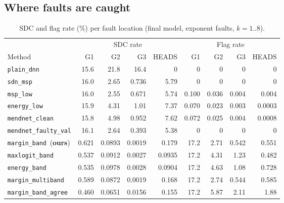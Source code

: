 \documentclass[10pt,a4paper]{article}
\newcommand{\meth}[1]{\texttt{#1}}
\newcommand{\ours}{\meth{margin\_band}}
\begin{document}
\subsection{Where faults are caught}

\begin{table}[H]
\centering\small
\caption{SDC and flag rate (\%) per fault location (final model, exponent faults, $k=1..8$).}
\label{tab:loc}
\begin{adjustbox}{max width=\linewidth}
\begin{tabular}{@{}lrrrrrrrr@{}}
\toprule
 & \multicolumn{4}{c}{SDC rate} & \multicolumn{4}{c}{Flag rate} \\
\cmidrule(lr){2-5}\cmidrule(l){6-9}
Method & G1 & G2 & G3 & HEADS & G1 & G2 & G3 & HEADS \\
\midrule
\meth{plain\_dnn}          & 15.6  & 21.8   & 16.4    & 0      & 0      & 0      & 0       & 0 \\
\meth{sdn\_msp}            & 16.0  & 2.65   & 0.736   & 5.79   & 0      & 0      & 0       & 0 \\
\meth{msp\_low}            & 16.0  & 2.55   & 0.671   & 5.74   & 0.100  & 0.036  & 0.004   & 0.004 \\
\meth{energy\_low}         & 15.9  & 4.31   & 1.01    & 7.37   & 0.070  & 0.023  & 0.003   & 0.0003 \\
\meth{mendnet\_clean}      & 15.8  & 4.98   & 0.952   & 7.62   & 0.072  & 0.025  & 0.004   & 0.0008 \\
\meth{mendnet\_faulty\_val}& 16.1  & 2.64   & 0.393   & 5.38   & 0      & 0      & 0       & 0 \\
\midrule
\ours\ (\textbf{ours})     & 0.621 & 0.0893 & 0.0019  & 0.179  & 17.2   & 2.71   & 0.542   & 0.551 \\
\meth{maxlogit\_band}      & 0.537 & 0.0912 & 0.0027  & 0.0935 & 17.2   & 4.31   & 1.23    & 0.482 \\
\meth{energy\_band}        & 0.535 & 0.0978 & 0.0028  & 0.0904 & 17.2   & 4.63   & 1.08    & 0.728 \\
\meth{margin\_multiband}   & 0.589 & 0.0872 & 0.0019  & 0.168  & 17.2   & 2.74   & 0.544   & 0.585 \\
\meth{margin\_band\_agree} & 0.460 & 0.0651 & 0.0156  & 0.155  & 17.2   & 5.87   & 2.11    & 1.88 \\
\bottomrule
\end{tabular}
\end{adjustbox}
\end{table}
\end{document}
